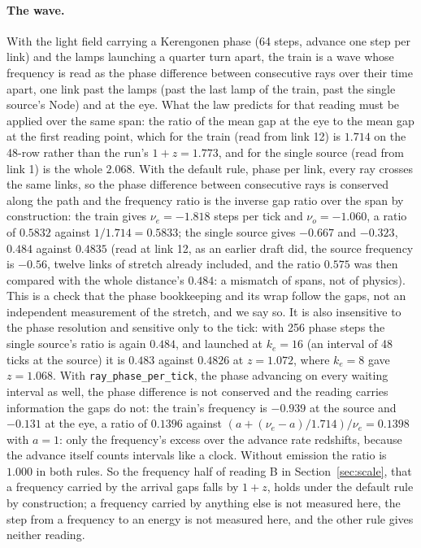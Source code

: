 \documentclass[11pt]{article}
\begin{document}
\paragraph{The wave.} With the light field carrying a Kerengonen phase
(64 steps, advance one step per link) and the lamps launching a quarter
turn apart, the train is a wave whose frequency is read as the phase
difference between consecutive rays over their time apart, one link past
the lamps (past the last lamp of the train, past the single source's Node)
and at the eye. What the law predicts for that reading must be applied
over the same span: the ratio of the mean gap at the eye to the mean gap
at the first reading point, which for the train (read from link 12) is
$1.714$ on the 48-row rather than the run's $1 + z = 1.773$, and for the
single source (read from link 1) is the whole $2.068$. With the default
rule, phase per link, every ray crosses the same links, so the phase
difference between consecutive rays is conserved along the path and the
frequency ratio is the inverse gap ratio over the span by construction:
the train gives $\nu_e = -1.818$ steps per tick and $\nu_o = -1.060$, a
ratio of $0.5832$ against $1/1.714 = 0.5833$; the single source gives
$-0.667$ and $-0.323$, $0.484$ against $0.4835$ (read at link 12, as an
earlier draft did, the source frequency is $-0.56$, twelve links of stretch
already included, and the ratio $0.575$ was then compared with the whole
distance's $0.484$: a mismatch of spans, not of physics). This is a check that the
phase bookkeeping and its wrap follow the gaps, not an independent
measurement of the stretch, and we say so. It is also insensitive to the
phase resolution and sensitive only to the tick: with 256 phase steps the
single source's ratio is again $0.484$, and launched at $k_e = 16$ (an
interval of 48 ticks at the source) it is $0.483$ against $0.4826$ at $z =
1.072$, where $k_e = 8$ gave $z = 1.068$. With
\texttt{ray\_phase\_per\_tick}, the phase advancing on every waiting
interval as well, the phase difference is not conserved and the reading
carries information the gaps do not: the train's frequency is $-0.939$ at
the source and $-0.131$ at the eye, a ratio of $0.1396$ against $(a +
(\nu_e - a)/1.714)/\nu_e = 0.1398$ with $a = 1$: only the frequency's
excess over the advance rate redshifts, because the advance itself counts
intervals like a clock. Without emission the ratio is $1.000$ in both
rules. So the frequency half of reading B in Section~\ref{sec:scale},
that a frequency carried by the arrival gaps falls by $1 + z$, holds under
the default rule by construction; a frequency carried by anything else is
not measured here, the step from a frequency to an energy is not measured
here, and the other rule gives neither reading.
\end{document}
